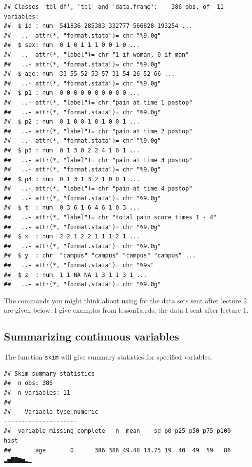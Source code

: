 \documentclass[]{book}
\newenvironment{Shaded}{\begin{snugshade}}{\end{snugshade}}
\newcommand{\KeywordTok}[1]{\textcolor[rgb]{0.13,0.29,0.53}{\textbf{#1}}}
\newcommand{\NormalTok}[1]{#1}
\newcommand{\OperatorTok}[1]{\textcolor[rgb]{0.81,0.36,0.00}{\textbf{#1}}}
\newcommand{\StringTok}[1]{\textcolor[rgb]{0.31,0.60,0.02}{#1}}
\begin{document}
\begin{verbatim}
## Classes 'tbl_df', 'tbl' and 'data.frame':    386 obs. of  11 variables:
##  $ id : num  541836 285383 332777 566828 193254 ...
##   ..- attr(*, "format.stata")= chr "%9.0g"
##  $ sex: num  0 1 0 1 1 1 0 0 1 0 ...
##   ..- attr(*, "label")= chr "1 if woman, 0 if man"
##   ..- attr(*, "format.stata")= chr "%9.0g"
##  $ age: num  33 55 52 53 57 31 54 26 52 66 ...
##   ..- attr(*, "format.stata")= chr "%9.0g"
##  $ p1 : num  0 0 0 0 0 0 0 0 0 0 ...
##   ..- attr(*, "label")= chr "pain at time 1 postop"
##   ..- attr(*, "format.stata")= chr "%9.0g"
##  $ p2 : num  0 1 0 0 1 0 1 0 0 1 ...
##   ..- attr(*, "label")= chr "pain at time 2 postop"
##   ..- attr(*, "format.stata")= chr "%9.0g"
##  $ p3 : num  0 1 3 0 2 2 4 1 0 1 ...
##   ..- attr(*, "label")= chr "pain at time 3 postop"
##   ..- attr(*, "format.stata")= chr "%9.0g"
##  $ p4 : num  0 1 3 1 3 2 1 0 0 1 ...
##   ..- attr(*, "label")= chr "pain at time 4 postop"
##   ..- attr(*, "format.stata")= chr "%9.0g"
##  $ t  : num  0 3 6 1 6 4 6 1 0 3 ...
##   ..- attr(*, "label")= chr "total pain score times 1 - 4"
##   ..- attr(*, "format.stata")= chr "%9.0g"
##  $ x  : num  2 2 1 2 2 1 1 1 2 1 ...
##   ..- attr(*, "format.stata")= chr "%9.0g"
##  $ y  : chr  "campus" "campus" "campus" "campus" ...
##   ..- attr(*, "format.stata")= chr "%9s"
##  $ z  : num  1 1 NA NA 1 3 1 1 3 1 ...
##   ..- attr(*, "format.stata")= chr "%9.0g"
\end{verbatim}

The commands you might think about using for the data sets sent after lecture 2 are given below. I give examples from lesson1a.rds, the data I sent after lecture 1.

\hypertarget{summarizing-continuous-variables}{%
\subsection{Summarizing continuous variables}\label{summarizing-continuous-variables}}

The function \texttt{skim} will give summary statistics for specified variables.

\begin{Shaded}
\end{Shaded}

\begin{verbatim}
## Skim summary statistics
##  n obs: 386 
##  n variables: 11 
## 
## -- Variable type:numeric ---------------------------------------------------------------
##  variable missing complete   n  mean    sd p0 p25 p50 p75 p100     hist
##       age       0      386 386 49.48 13.75 19  40  49  59   86 ▂▅▇▇▆▅▂▁
\end{verbatim}
\end{document}
